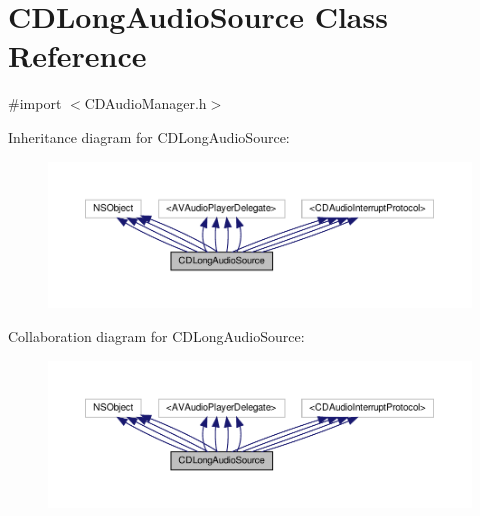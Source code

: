 \hypertarget{interfaceCDLongAudioSource}{}\section{C\+D\+Long\+Audio\+Source Class Reference}
\label{interfaceCDLongAudioSource}


{\ttfamily \#import $<$C\+D\+Audio\+Manager.\+h$>$}



Inheritance diagram for C\+D\+Long\+Audio\+Source\+:
\nopagebreak
\begin{figure}[H]
\begin{center}
\leavevmode
\includegraphics[width=350pt]{interfaceCDLongAudioSource__inherit__graph}
\end{center}
\end{figure}


Collaboration diagram for C\+D\+Long\+Audio\+Source\+:
\nopagebreak
\begin{figure}[H]
\begin{center}
\leavevmode
\includegraphics[width=350pt]{interfaceCDLongAudioSource__coll__graph}
\end{center}
\end{figure}
